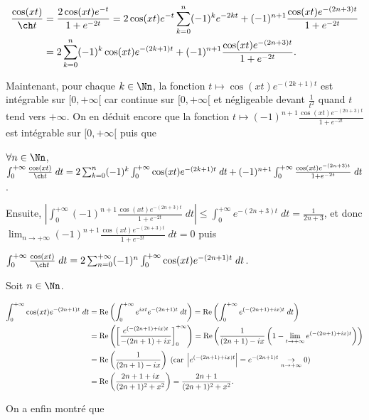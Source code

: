 {{\begin{align*}\ensuremath
\frac{\cos(xt)}{\ch t}&=\frac{2\cos(xt)e^{-t}}{1+e^{-2t}}=2\cos(xt)e^{-t}\sum_{k=0}^{n}(-1)^ke^{-2kt}+(-1)^{n+1}\frac{\cos(xt)e^{-(2n+3)t}}{1+e^{-2t}}\\
 &=2\sum_{k=0}^{n}(-1)^k\cos(xt)e^{-(2k+1)t}+(-1)^{n+1}\frac{\cos(xt)e^{-(2n+3)t}}{1+e^{-2t}}.
\end{align*}

Maintenant, pour chaque $k\in\Nn$, la fonction $t\mapsto\cos(xt)e^{-(2k+1)t}$ est intégrable sur $[0,+\infty[$ car continue sur $[0,+\infty[$ et négligeable devant $\frac{1}{t^2}$ quand $t$ tend vers $+\infty$. On en déduit encore que la fonction $t\mapsto (-1)^{n+1}\frac{\cos(xt)e^{-(2n+3)t}}{1+e^{-2t}}$ est intégrable sur $[0,+\infty[$ puis que 

\begin{center}
$\forall n\in\Nn$, $\int_{0}^{+\infty}\frac{\cos(xt)}{\ch t}\;dt=2\sum_{k=0}^{n}(-1)^k\int_{0}^{+\infty}\cos(xt)e^{-(2k+1)t}\;dt+(-1)^{n+1}\int_{0}^{+\infty}\frac{\cos(xt)e^{-(2n+3)t}}{1+e^{-2t}}\;dt$.
\end{center}

Ensuite, $\left|\int_{0}^{+\infty}(-1)^{n+1}\frac{\cos(xt)e^{-(2n+3)t}}{1+e^{-2t}}\;dt\right|\leqslant\int_{0}^{+\infty}e^{-(2n+3)t}\;dt=\frac{1}{2n+3}$, et donc $\lim_{n \rightarrow +\infty}(-1)^{n+1}\frac{\cos(xt)e^{-(2n+3)t}}{1+e^{-2t}}\;dt=0$ puis

\begin{center}
$\int_{0}^{+\infty}\frac{\cos(xt)}{\ch t}\;dt=2\sum_{n=0}^{+\infty}(-1)^n\int_{0}^{+\infty}\cos(xt)e^{-(2n+1)t}\;dt$.
\end{center}

Soit $n\in\Nn$.

\begin{align*}\ensuremath
\int_{0}^{+\infty}\cos(xt)e^{-(2n+1)t}\;dt&=\text{Re}\left(\int_{0}^{+\infty}e^{ixt}e^{-(2n+1)t}\;dt\right)=\text{Re}\left(\int_{0}^{+\infty}e^{(-(2n+1)+ix)t}\;dt\right)\\
 &=\text{Re}\left(\left[\frac{e^{(-(2n+1)+ix)t}}{-(2n+1)+ix}\right]_0^{+\infty}\right)=\text{Re}\left(\frac{1}{(2n+1)-ix}\left(1-\lim_{t \rightarrow +\infty}e^{(-(2n+1)+ix)t}\right)\right)\\
 &=\text{Re}\left(\frac{1}{(2n+1)-ix}\right)\;(\text{car}\;\left|e^{(-(2n+1)+ix)t}\right|=e^{-(2n+1)t}\underset{n\rightarrow+\infty}{\rightarrow}0)\\
 &=\text{Re}\left(\frac{2n+1+ix}{(2n+1)^2+x^2}\right)=\frac{2n+1}{(2n+1)^2+x^2}.
\end{align*}

On a enfin montré que

\begin{center}
\end{center}
}
}
